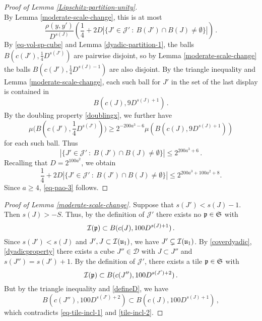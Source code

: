 {\begin{proof}[Proof of Lemma \ref{Lipschitz-partition-unity}]
$$        $$
        By Lemma \ref{moderate-scale-change}, this is at most
        $$
             \frac{\rho(y,y')}{D^{s(J)}} \left( \frac{1}{4} + 2D |\{J' \in \mathcal{J}' \ : \  B(J') \cap B(J) \ne \emptyset\}|\right)\,.
        $$
        By \eqref{eq-vol-sp-cube} and Lemma \ref{dyadic-partition-1}, the balls $B(c(J'), \frac{1}{4} D^{s(J')})$ are pairwise disjoint, so by Lemma \ref{moderate-scale-change} the balls $B(c(J'), \frac{1}{4} D^{s(J) - 1})$ are also disjoint. By the triangle inequality and Lemma \ref{moderate-scale-change}, each such ball for $J'$ in the set of the last display is contained in
        $$
            B(c(J), 9 D^{s(J) + 1})\,.
        $$
        By the doubling property \eqref{doublingx}, we further have
        $$
            \mu\Big(B(c(J'), \frac{1}{4}D^{s(J')})\Big) \ge 2^{-200a^3 - 6} \mu(B(c(J), 9 D^{s(J) + 1}))
        $$
        for each such ball.
        Thus
        $$
            |\{J' \in \mathcal{J}' \ : \  B(J') \cap B(J) \ne \emptyset\}| \le 2^{200a^3 + 6}\,.
        $$
        Recalling that $D=2^{100a^2}$, we obtain
        $$\frac{1}{4} + 2D |\{J' \in \mathcal{J}' \ : \  B(J') \cap B(J) \ne \emptyset\}|\leq 2^{200a^3 + 100a^2+ 8}.$$
        Since $a\ge 4$, \eqref{eq-pao-3} follows.
    \end{proof}

    \begin{proof}[Proof of Lemma \ref{moderate-scale-change}]
        Suppose that $s(J') < s(J) - 1$. Then $s(J) > -S$. Thus, by the definition of $\mathcal{J}'$ there exists no ${\mathfrak p} \in \mathfrak{S}$ with
        \begin{equation}
            \label{eq-tile-incl-1}
            {\mathcal{I}}({\mathfrak p}) \subset B(c(J), 100D^{s(J) + 1})\,.
        \end{equation}
        Since $s(J') < s(J)$ and $J', J \subset {\mathcal{I}}({\mathfrak u}_1)$, we have $J' \subsetneq {\mathcal{I}}({\mathfrak u}_1)$.
        By \eqref{coverdyadic}, \eqref{dyadicproperty} there exists a cube $J'' \in \mathcal{D}$ with $J \subset J''$ and $s(J'') = s(J') + 1$. By the definition of $\mathcal{J}'$, there exists a tile ${\mathfrak p} \in \mathfrak{S}$ with
        \begin{equation}
            \label{tile-incl-2}
            {\mathcal{I}}({\mathfrak p}) \subset B(c(J''), 100 D^{s(J')+2})\,.
        \end{equation}
        But by the triangle inequality and \eqref{defineD}, we have
        $$
            B(c(J''), 100 D^{s(J')+2}) \subset B(c(J), 100D^{s(J) + 1})\,,
        $$
        which contradicts \eqref{eq-tile-incl-1} and \eqref{tile-incl-2}.
    \end{proof}


}
